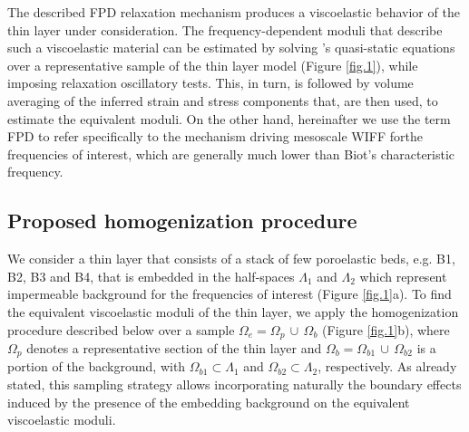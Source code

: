 \documentclass[draft]{agujournal2019}
\begin{document}
The described FPD relaxation mechanism produces a viscoelastic behavior of the thin layer under consideration. The frequency-dependent moduli that describe such a viscoelastic material can be estimated by solving \citeauthor{Biot1941}'s \citeyear{Biot1941} quasi-static equations over a representative sample of the thin layer model (Figure \ref{fig.1}), while imposing relaxation oscillatory tests. This, in turn, is followed by volume averaging of the inferred strain and stress components that, are then used, to estimate the equivalent moduli. On the other hand, hereinafter we use the term FPD to refer specifically to the mechanism driving mesoscale WIFF forthe frequencies of interest, which are generally much lower than Biot's characteristic frequency.

\subsection{Proposed homogenization procedure}
We consider a thin layer that consists of a stack of few poroelastic beds, e.g. B1, B2, B3 and B4, that is embedded in the half-spaces $\Lambda_1$ and $\Lambda_2$ which represent impermeable background for the frequencies of interest (Figure \ref{fig.1}a). To find the equivalent viscoelastic moduli of the thin layer, we apply the homogenization procedure described below over a sample $\Omega_e = \Omega_p \,\cup \, \Omega_b$ (Figure \ref{fig.1}b), where $\Omega_p$ denotes a representative section of the thin  layer and $\Omega_b =\Omega_{b1}\, \cup \, \Omega_{b2}$ is a portion of the background, with $\Omega_{b1} \subset \Lambda_1$ and $\Omega_{b2} \subset \Lambda_2$, respectively. As already stated, this sampling strategy allows incorporating naturally the boundary effects induced by the presence of the embedding background on the equivalent viscoelastic moduli.
\end{document}
